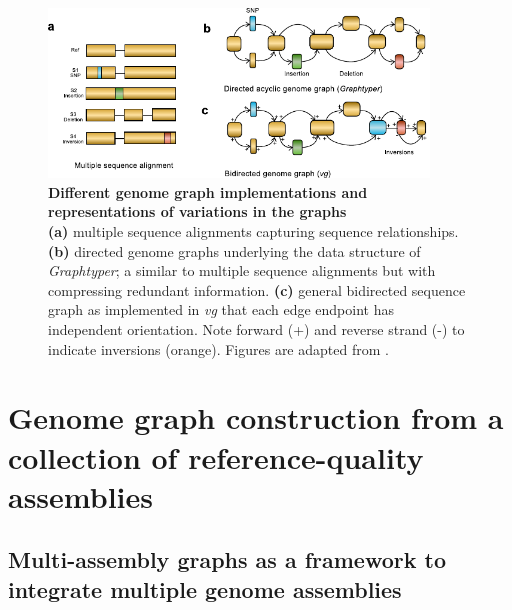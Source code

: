 \documentclass[../main.tex]{subfiles}
\begin{document}
\begin{figure}[!htb]
    \centering
    \includegraphics[width=0.9\textwidth]{intro/fig6.pdf}
        \vspace{3mm}
        \caption[Genetic variant representation in the genome graphs]{\textbf{Different genome graph implementations and representations of variations in the graphs} \\
        \footnotesize{\textbf{(a)} multiple sequence alignments capturing sequence relationships. \textbf{(b)} directed genome graphs underlying the data structure of \emph{Graphtyper}; a similar to multiple sequence alignments but with compressing redundant information. \textbf{(c)} general bidirected sequence graph as implemented in \emph{vg} that each edge endpoint has independent orientation. Note  forward (+) and reverse strand (-) to indicate inversions (orange). Figures are adapted from \citet{eizenga2020pangenome}.}}
        \label{fig16:mut}
\end{figure}


\section[Construction of the multi-assembly graphs]{Genome graph construction from a collection of reference-quality assemblies}

\subsection*{Multi-assembly graphs as a framework to integrate multiple genome assemblies}
\end{document}
